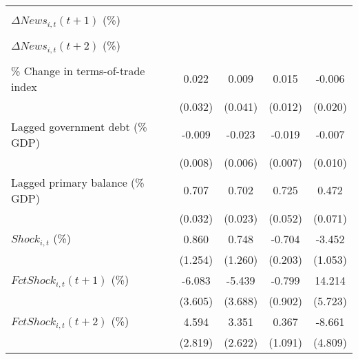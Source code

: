 {\begin{tabular}{l*{4}{c}}
                    &                     &                     &                     &                     \\
\addlinespace
$ \Delta News_{i,t}(t+1)$ (\%)&                     &                     &                     &                     \\
                    &                     &                     &                     &                     \\
\addlinespace
$ \Delta News_{i,t}(t+2)$ (\%)&                     &                     &                     &                     \\
                    &                     &                     &                     &                     \\
\addlinespace
\% Change in terms-of-trade index&       0.022         &       0.009         &       0.015         &      -0.006         \\
                    &     (0.032)         &     (0.041)         &     (0.012)         &     (0.020)         \\
\addlinespace
Lagged government debt (\% GDP)&      -0.009         &      -0.023\sym{***}&      -0.019\sym{**} &      -0.007         \\
                    &     (0.008)         &     (0.006)         &     (0.007)         &     (0.010)         \\
\addlinespace
Lagged primary balance (\% GDP)&       0.707\sym{***}&       0.702\sym{***}&       0.725\sym{***}&       0.472\sym{***}\\
                    &     (0.032)         &     (0.023)         &     (0.052)         &     (0.071)         \\
\addlinespace
$ Shock_{i,t}$ (\%) &       0.860         &       0.748         &      -0.704\sym{***}&      -3.452\sym{***}\\
                    &     (1.254)         &     (1.260)         &     (0.203)         &     (1.053)         \\
\addlinespace
$ FctShock_{i,t}(t+1)$ (\%)&      -6.083         &      -5.439         &      -0.799         &      14.214\sym{**} \\
                    &     (3.605)         &     (3.688)         &     (0.902)         &     (5.723)         \\
\addlinespace
$ FctShock_{i,t}(t+2)$ (\%)&       4.594         &       3.351         &       0.367         &      -8.661         \\
                    &     (2.819)         &     (2.622)         &     (1.091)         &     (4.809)         \\

\end{tabular}}
